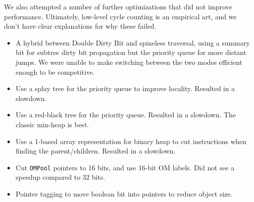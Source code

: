 We also attempted a number of further optimizations
  that did not improve performance.
Ultimately, low-level cycle counting is an empirical art,
  and we don't have clear explanations for why these failed.
\begin{itemize}
\item A hybrid between Double Dirty Bit and spineless traversal,
  using a summary bit for subtree dirty bit propagation
  but the priority queue for more distant jumps.
  We were unable to make switching between the two modes efficient enough
  to be competitive.
\item Use a splay tree for the priority queue to improve locality.
  Resulted in a slowdown.
\item Use a red-black tree for the priority queue.
  Resulted in a slowdown. The classic min-heap is best.
\item Use a 1-based array representation for binary heap
  to cut instructions when finding the parent/children.
  Resulted in a slowdown.
\item Cut \texttt{OMPool} pointers to 16 bits, and use 16-bit OM labels.
  Did not see a speedup compared to 32 bits.
\item Pointer tagging to move boolean bit into pointers to reduce object size.
\end{itemize}